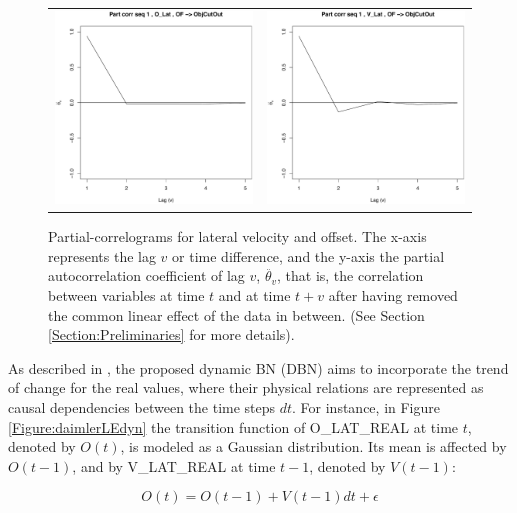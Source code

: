 \begin{figure}
  \centering
    \begin{tabular}{cc}
        \includegraphics[width=60mm]{figures/DaimlerPcorrOBJ_R5Offs.pdf}&
    \includegraphics[width=60mm]{figures/DaimlerPcorrOBJ_R5Vel.pdf}\\
  \end{tabular}
    \caption{\label{Figure:daimlerPartialCorrel}Partial-correlograms for lateral velocity and offset. The x-axis represents the lag $v$ or time difference, and the y-axis the partial autocorrelation coefficient of lag $v$, $\ddot{\theta_v}$, that is, the correlation between variables at time $t$ and at time $t+v$ after having removed the common linear effect of the data in between. (See Section \ref{Section:Preliminaries} for more details).}
\end{figure}


As described in \cite{Weidl2014}, the proposed dynamic BN (DBN) aims to incorporate the trend of change for the real values, where their physical relations are represented as causal dependencies between the time steps $dt$. For instance, in Figure \ref{Figure:daimlerLEdyn} the transition function of O\_LAT\_REAL at time $t$, denoted by $O(t)$, is modeled as a Gaussian distribution. Its mean is affected by $O(t-1)$, and by V\_LAT\_REAL at time $t-1$, denoted by $V(t-1)$:

\begin{equation}
O(t) =O(t-1) +V(t-1)dt +\epsilon
\end{equation}


